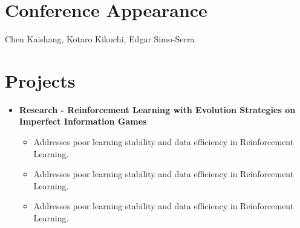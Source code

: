\section{Conference Appearance}
\resumeSubHeadingListStart
{}
{Chen Kaishang, Kotaro Kikuchi, Edgar Simo-Serra}{}
\resumeSubHeadingListEnd
\vspace{-5pt}

\section{Projects}

\begin{itemize}[leftmargin=*]
    \item{\textbf{Research - Reinforcement Learning with Evolution Strategies on Imperfect Information Games}}
        \begin{itemize}
                \vspace{-5pt}
                \item Addresses poor learning stability and data efficiency in Reinforcement Learning.
                \item Addresses poor learning stability and data efficiency in Reinforcement Learning.
                \item Addresses poor learning stability and data efficiency in Reinforcement Learning.
        \end{itemize}

\end{itemize}


